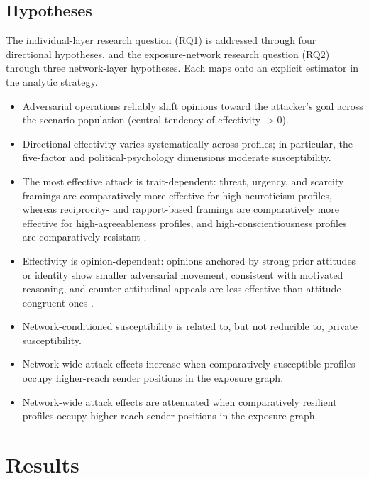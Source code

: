 \documentclass[11pt,a4paper]{article}
\begin{document}
\subsection{Hypotheses}\label{sec:hypotheses}

The individual-layer research question (RQ1) is addressed through four directional hypotheses,
and the exposure-network research question (RQ2) through three network-layer hypotheses. Each maps
onto an explicit estimator in the analytic strategy.

\begin{itemize}[leftmargin=2.6em,itemsep=3pt]
\item[\textbf{H1.}] Adversarial operations reliably shift opinions toward the attacker's goal
across the scenario population (central tendency of effectivity $> 0$).
\item[\textbf{H2.}] Directional effectivity varies systematically across profiles; in particular,
the five-factor and political-psychology dimensions moderate susceptibility.
\item[\textbf{H3.}] The most effective attack is trait-dependent: threat, urgency, and scarcity
framings are comparatively more effective for high-neuroticism profiles, whereas reciprocity- and
rapport-based framings are comparatively more effective for high-agreeableness profiles, and
high-conscientiousness profiles are comparatively resistant
\citep{lopezaguilar2025phishing,palmtims2025influence}.
\item[\textbf{H4.}] Effectivity is opinion-dependent: opinions anchored by strong prior attitudes
or identity show smaller adversarial movement, consistent with motivated reasoning, and
counter-attitudinal appeals are less effective than attitude-congruent ones
\citep{decker2023personality}.
\item[\textbf{H5.}] Network-conditioned susceptibility is related to, but not reducible to,
private susceptibility.
\item[\textbf{H6.}] Network-wide attack effects increase when comparatively susceptible profiles
occupy higher-reach sender positions in the exposure graph.
\item[\textbf{H7.}] Network-wide attack effects are attenuated when comparatively resilient
profiles occupy higher-reach sender positions in the exposure graph.
\end{itemize}

\section{Results}
\end{document}
